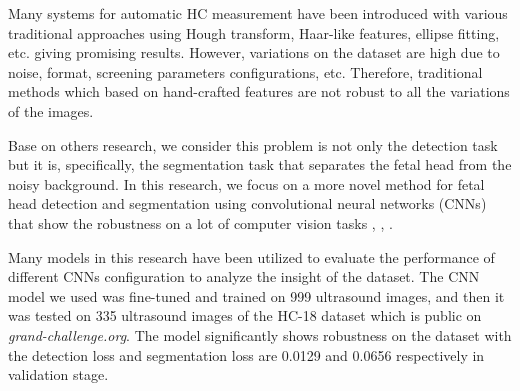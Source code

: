 	Many systems for automatic HC measurement have been introduced with various traditional approaches using Hough transform, Haar-like features, ellipse fitting, etc. giving promising results. However, variations on the dataset are high due to noise, format, screening parameters configurations, etc. Therefore, traditional methods which based on hand-crafted features are not robust to all the variations of the images. 
	
	Base on others research, we consider this problem is not only the detection task but it is, specifically, the segmentation task that separates the fetal head from the noisy background. In this research, we focus on a more novel method for fetal head detection and segmentation using convolutional neural networks (CNNs) that show the robustness on a lot of computer vision tasks \cite{yamashita}, \cite{guidetocnn}, \cite{dlvstradition}. 
	
	Many models in this research have been utilized to evaluate the performance of different CNNs configuration to analyze the insight of the dataset. The CNN model we used was fine-tuned and trained on 999 ultrasound images, and then it was tested on 335 ultrasound images of the HC-18 dataset which is public on \textit{grand-challenge.org}. The model significantly shows robustness on the dataset with the detection loss and segmentation loss are 0.0129 and 0.0656 respectively in validation stage.

	
 
	
	


